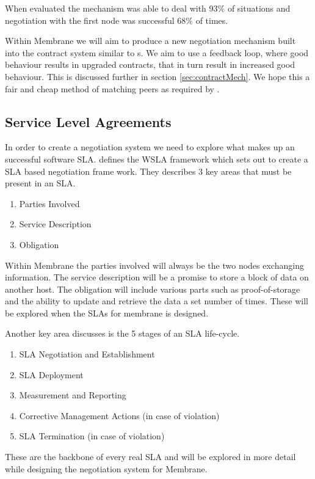 \documentclass[11pt, a4paper, twoside]{report}
\begin{document}
When evaluated the mechanism was able to deal with 93\% of situations and negotiation with the first node was successful 68\% of times. \citep{herrero2007agents}

Within Membrane we will aim to produce a new negotiation mechanism built into the  contract system similar to \cite{paletta2009mas}s. We aim to use a feedback loop, where good behaviour results in upgraded contracts, that in turn result in increased good behaviour. This is discussed further in section \ref{sec:contractMech}. We hope this a fair and cheap method of matching peers as required by \cite{rahwan2005interest}.

\subsection{Service Level Agreements}

In order to create a negotiation system we need to explore what makes up an successful software SLA. \cite{keller2002defining} defines the WSLA framework which sets out to create a SLA based negotiation frame work.
They describes 3 key areas that must be present in an SLA.
\begin{enumerate}
 \item Parties Involved
 \item Service Description
 \item Obligation
\end{enumerate}

Within Membrane the parties involved will always be the two nodes exchanging information. The service description will be a promise to store a block of data on another host. The obligation will include various parts such as proof-of-storage and the ability to update and retrieve the data a set number of times. These will be explored when the SLAs for membrane is designed.

Another key area \cite{keller2002defining} discusses is the 5 stages of an SLA life-cycle.
\begin{enumerate}
 \item SLA Negotiation and Establishment
 \item SLA Deployment
 \item Measurement and Reporting
 \item Corrective Management Actions (in case of violation)
 \item SLA Termination (in case of violation)
\end{enumerate}

These are the backbone of every real SLA and will be explored in more detail while designing the negotiation system for Membrane.
\end{document}
